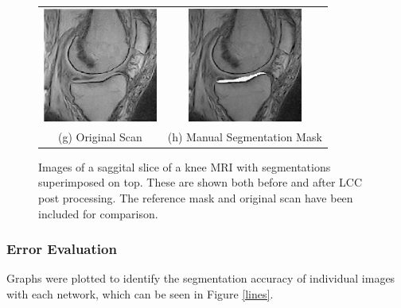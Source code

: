 \documentclass[11pt,a4paper]{memoir}
\numberwithin{figure}{section}
\numberwithin{table}{section}
\numberwithin{equation}{section}
\begin{document}
\begin{figure}
\begin{tabular}{cc}
\includegraphics[width = 3.75cm]{natural.jpg} & \includegraphics[width = 3.75cm]{labal.jpeg}\\
(g) Original Scan &(h) Manual Segmentation Mask\\
\end{tabular}
\caption[Example of an image before and after segmentation and post-processing]{Images of a saggital slice of a knee MRI with segmentations superimposed on top. These are shown both before and after LCC post processing. The reference mask and original scan have been included for comparison. }
\label{compare}
\end{figure}

\clearpage
\subsubsection{Error Evaluation}
Graphs were plotted to identify the segmentation accuracy of individual images with each network, which can be seen in Figure \ref{lines}.
\end{document}
